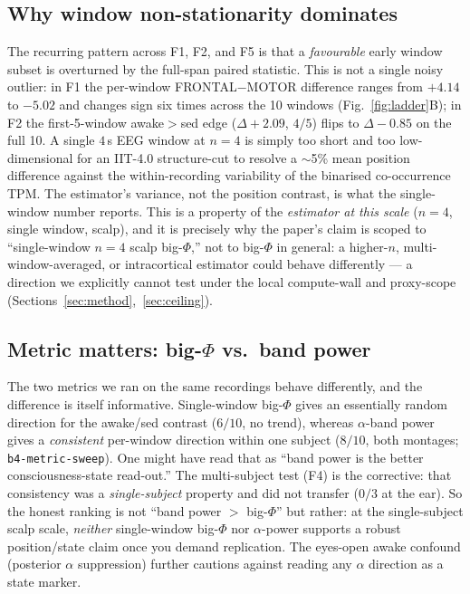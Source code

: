 \documentclass[11pt,a4paper]{article}
\begin{document}
\subsection{Why window non-stationarity dominates}
The recurring pattern across F1, F2, and F5 is that a \emph{favourable} early
window subset is overturned by the full-span paired statistic. This is not a
single noisy outlier: in F1 the per-window FRONTAL$-$MOTOR difference ranges
from $+4.14$ to $-5.02$ and changes sign six times across the 10 windows
(Fig.~\ref{fig:ladder}B); in F2 the first-5-window awake$>$sed edge
($\Delta{+}2.09$, $4/5$) flips to $\Delta{-}0.85$ on the full 10. A single
$4\,$s EEG window at $n{=}4$ is simply too short and too low-dimensional for an
IIT-4.0 structure-cut to resolve a $\sim$5\% mean position difference against
the within-recording variability of the binarised co-occurrence TPM. The
estimator's variance, not the position contrast, is what the single-window
number reports. This is a property of the \emph{estimator at this scale}
($n{=}4$, single window, scalp), and it is precisely why the paper's claim is
scoped to ``single-window $n{=}4$ scalp big-$\Phi$,'' not to big-$\Phi$ in
general: a higher-$n$, multi-window-averaged, or intracortical estimator could
behave differently --- a direction we explicitly cannot test under the local
compute-wall and proxy-scope (Sections~\ref{sec:method},~\ref{sec:ceiling}).

\subsection{Metric matters: big-$\Phi$ vs.\ band power}
The two metrics we ran on the same recordings behave differently, and the
difference is itself informative. Single-window big-$\Phi$ gives an essentially
random direction for the awake/sed contrast ($6/10$, no trend), whereas
$\alpha$-band power gives a \emph{consistent} per-window direction within one
subject ($8/10$, both montages; \texttt{b4-metric-sweep}). One might have read
that as ``band power is the better consciousness-state read-out.'' The
multi-subject test (F4) is the corrective: that consistency was a
\emph{single-subject} property and did not transfer ($0/3$ at the ear). So the
honest ranking is not ``band power $>$ big-$\Phi$'' but rather: at the
single-subject scalp scale, \emph{neither} single-window big-$\Phi$ nor
$\alpha$-power supports a robust position/state claim once you demand
replication. The eyes-open awake confound (posterior $\alpha$ suppression)
further cautions against reading any $\alpha$ direction as a state marker.
\end{document}

